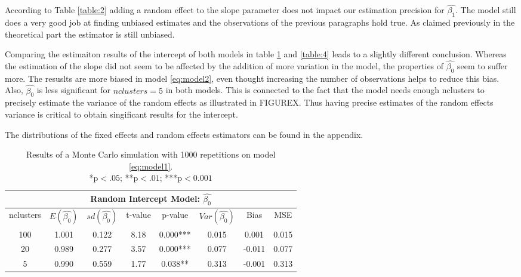 \documentclass[a4paper,11pt]{article}
\begin{document}
	According to Table \ref{table:2} adding a random effect to the slope parameter does not impact our estimation precision for $\hat{\beta_1}$. The model still does a very good job at finding unbiased estimates and the observations of the previous paragraphs hold true. As claimed previously in the theoretical part the estimator is still unbiased.
	
	Comparing the estimaiton results of the intercept of both models in table \ref{table:3} and \ref{table:4} leads to a slightly different conclusion. Whereas the estimation of the slope did  not seem to be affected by the addition of more variation in the model, the properties of $\hat{\beta_0}$ seem to suffer more. The resuslts are more biased in model \ref{eq:model2}, even thought increasing the number of observations helps to reduce this bias. 
	Also, $\hat{\beta_0}$ is less significant for $nclusters=5$ in both models. This is connected to the fact that the model needs enough nclusters to precisely estimate the variance of the random effects as illustrated in FIGUREX. Thus having precise estimates of the random effects variance is critical to obtain singificant results for the intercept.
	 
	The distributions of the fixed effects and random effects estimators can be found in the appendix.
		\begin{table}[h!]
		\centering
		\begin{tabular}{||c c c c c c c c||} 
			\hline
			\multicolumn{8}{|c|}{Random Intercept Model: $\hat{\beta_0}$} \\
			
			\hline
			nclusters & $E(\hat{\beta_0})$ & $sd(\hat{\beta_0})$& t-value & p-value &$Var(\hat{\beta_0})$ & Bias & MSE \\ [0.5ex] 
			\hline
			100 & 1.001 & 0.122&8.18 &0.000***	&0.015 &0.001 &   0.015 \\ 
			20 & 0.989 &	0.277&3.57 &0.000*** &0.077 &-0.011 &  0.077  \\ 	
			5 & 	0.990&  0.559& 1.77&0.038**  &0.313 &-0.001 &   0.313 \\ 
			[1ex] 
			\hline
		\end{tabular}
		\caption{Results of a Monte Carlo simulation with 1000 repetitions on model \ref{eq:model1}. \\*p$<.05$; **p$<.01$; ***p$<0.001$}
				\label{table:3}
	\end{table}
\end{document}
